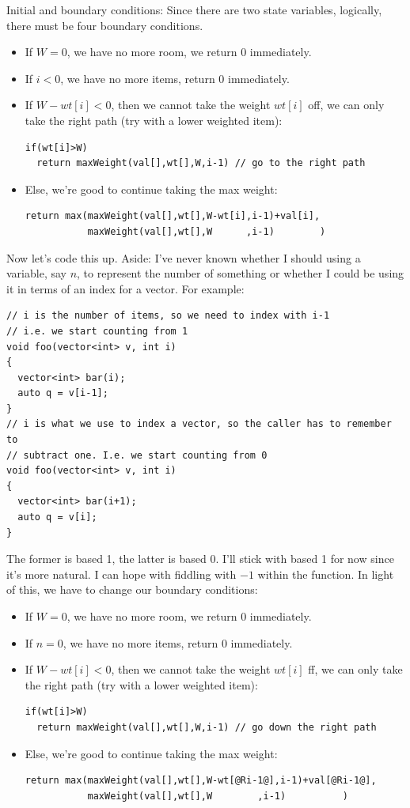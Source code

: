 Initial and boundary conditions: Since there are two state variables,
logically, there must be four boundary conditions.
\begin{itemize}%
\item If $W=0$, we have no more room, we return $0$ immediately.
\item If $i < 0$, we have no more items, return $0$ immediately.
\item If $W-wt[i]<0$, then we cannot take the weight $wt[i]$ off, we can
  only take the right path (try with a lower weighted item):
\begin{lstlisting}[style=pseudostyle]
if(wt[i]>W)
  return maxWeight(val[],wt[],W,i-1) // go to the right path
\end{lstlisting}
\item Else, we're good to continue taking the max weight:
\begin{lstlisting}[style=pseudostyle]
return max(maxWeight(val[],wt[],W-wt[i],i-1)+val[i],
           maxWeight(val[],wt[],W      ,i-1)        )
\end{lstlisting}
\end{itemize}
Now let's code this up. Aside: I've never known whether I should using a
variable, say $n$, to represent the number of something or whether I could
be using it in terms of an index for a vector. For example:
\begin{lstlisting}[style=raycppnewsnippet]
// i is the number of items, so we need to index with i-1
// i.e. we start counting from 1
void foo(vector<int> v, int i)
{
  vector<int> bar(i);
  auto q = v[i-1];
}
// i is what we use to index a vector, so the caller has to remember to 
// subtract one. I.e. we start counting from 0
void foo(vector<int> v, int i)
{
  vector<int> bar(i+1);
  auto q = v[i];
}
\end{lstlisting}
The former is based 1, the latter is based 0. I'll stick with based 1 for
now since it's more natural. I can hope with fiddling with $-1$ within the
function. In light of this, we have to change our boundary conditions:
\begin{itemize}%
\item If $W=0$, we have no more room, we return $0$ immediately.
\item If $n=0$, we have no more items, return $0$ immediately.
\item If $W-wt[i]<0$, then we cannot take the weight $wt[i]$ ff, we can only
  take the right path (try with a lower weighted item):
\begin{lstlisting}[style=raycppnewsnippet]
if(wt[i]>W)
  return maxWeight(val[],wt[],W,i-1) // go down the right path
\end{lstlisting}
\item Else, we're good to continue taking the max weight:
\begin{lstlisting}[style=raycppnewsnippet]
return max(maxWeight(val[],wt[],W-wt[@Ri-1@],i-1)+val[@Ri-1@],
           maxWeight(val[],wt[],W        ,i-1)          )
\end{lstlisting}
\end{itemize}
